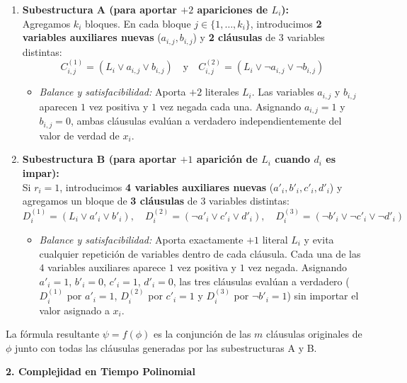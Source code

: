\begin{enumerate}[label=\arabic*., leftmargin=*]
    \item \textbf{Subestructura A (para aportar $+2$ apariciones de $L_i$):}\\
    Agregamos $k_i$ bloques. En cada bloque $j \in \{1, \dots, k_i\}$, introducimos \textbf{2 variables auxiliares nuevas} ($a_{i,j}, b_{i,j}$) y \textbf{2 cláusulas} de $3$ variables distintas:
    \[ C_{i,j}^{(1)} = (L_i \lor a_{i,j} \lor b_{i,j}) \quad \text{y} \quad C_{i,j}^{(2)} = (L_i \lor \neg a_{i,j} \lor \neg b_{i,j}) \]
    \begin{itemize}[leftmargin=*]
        \item \textit{Balance y satisfacibilidad:} Aporta $+2$ literales $L_i$. Las variables $a_{i,j}$ y $b_{i,j}$ aparecen $1$ vez positiva y $1$ vez negada cada una. Asignando $a_{i,j} = 1$ y $b_{i,j} = 0$, ambas cláusulas evalúan a verdadero independientemente del valor de verdad de $x_i$.
    \end{itemize}

    \item \textbf{Subestructura B (para aportar $+1$ aparición de $L_i$ cuando $d_i$ es impar):}\\
    Si $r_i = 1$, introducimos \textbf{4 variables auxiliares nuevas} ($a'_i, b'_i, c'_i, d'_i$) y agregamos un bloque de \textbf{3 cláusulas} de $3$ variables distintas:
    \[ D_i^{(1)} = (L_i \lor a'_i \lor b'_i), \quad D_i^{(2)} = (\neg a'_i \lor c'_i \lor d'_i), \quad D_i^{(3)} = (\neg b'_i \lor \neg c'_i \lor \neg d'_i) \]
    \begin{itemize}[leftmargin=*]
        \item \textit{Balance y satisfacibilidad:} Aporta exactamente $+1$ literal $L_i$ y evita cualquier repetición de variables dentro de cada cláusula. Cada una de las $4$ variables auxiliares aparece $1$ vez positiva y $1$ vez negada. Asignando $a'_i = 1$, $b'_i = 0$, $c'_i = 1$, $d'_i = 0$, las tres cláusulas evalúan a verdadero ($D_i^{(1)}$ por $a'_i = 1$, $D_i^{(2)}$ por $c'_i = 1$ y $D_i^{(3)}$ por $\neg b'_i = 1$) sin importar el valor asignado a $x_i$.
    \end{itemize}
\end{enumerate}

La fórmula resultante $\psi = f(\phi)$ es la conjunción de las $m$ cláusulas originales de $\phi$ junto con todas las cláusulas generadas por las subestructuras A y B.

\vspace{0.3cm}
\noindent\textbf{2. Complejidad en Tiempo Polinomial}

